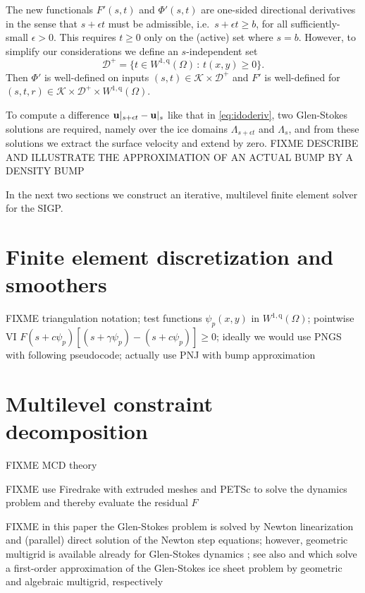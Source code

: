 \documentclass[letterpaper,final,12pt,reqno]{amsart}
\theoremstyle{claim}
\newcommand{\eps}{\epsilon}
\newcommand{\bu}{\mathbf{u}}
\newcommand{\qq}{{\text{q}}}
\numberwithin{equation}{section}
\numberwithin{figure}{section}
\numberwithin{table}{section}
\numberwithin{theorem}{section}
\begin{document}
The new functionals $F'(s,t)$ and $\Phi'(s,t)$ are one-sided directional derivatives in the sense that $s+\eps t$ must be admissible, i.e.~$s+\eps t\ge b$, for all sufficiently-small $\eps>0$.  This requires $t\ge 0$ only on the (active) set where $s=b$.  However, to simplify our considerations we define an $s$-independent set
\begin{equation}
\mathcal{D}^+ = \{t \in W^{1,\qq}(\Omega) \,:\, t(x,y) \ge 0\}. \label{eq:infdefectset}
\end{equation}
Then $\Phi'$ is well-defined on inputs $(s,t) \in \mathcal{K} \times \mathcal{D}^+$ and $F'$ is well-defined for $(s,t,r) \in \mathcal{K} \times \mathcal{D}^+ \times W^{1,\qq}(\Omega)$.

To compute a difference $\bu|_{s+\eps t} - \bus$ like that in \eqref{eq:idoderiv}, two Glen-Stokes solutions are required, namely over the ice domains $\Lambda_{s+\eps t}$ and $\Lambda_s$, and from these solutions we extract the surface velocity and extend by zero.  FIXME DESCRIBE AND ILLUSTRATE THE APPROXIMATION OF AN ACTUAL BUMP BY A DENSITY BUMP

In the next two sections we construct an iterative, multilevel finite element solver for the SIGP.


\section{Finite element discretization and smoothers} \label{sec:fesmoothers}

FIXME triangulation notation; test functions $\psi_p(x,y)$ in $W^{1,\qq}(\Omega)$; pointwise VI $F(s+c\psi_p)[(s+\gamma \psi_p) - (s+c \psi_p)] \ge 0$; ideally we would use PNGS with following pseudocode; actually use PNJ with bump approximation


\section{Multilevel constraint decomposition} \label{sec:mcdstokes}

FIXME MCD theory

FIXME use Firedrake \cite{Alnaesetal2014,Rathgeberetal2016} with extruded meshes \cite{Gibsonetal2019,McRaeetal2016} and PETSc \cite{Balayetal2020,Bueler2021} to solve the dynamics problem and thereby evaluate the residual $F$

FIXME in this paper the Glen-Stokes problem is solved by Newton linearization and (parallel) direct solution of the Newton step equations; however, geometric multigrid is available already for Glen-Stokes dynamics \cite{IsaacStadlerGhattas2015}; see also \cite{BrownSmithAhmadia2013} and \cite{Tuminaroetal2016} which solve a first-order approximation of the Glen-Stokes ice sheet problem by geometric and algebraic multigrid, respectively
\end{document}
